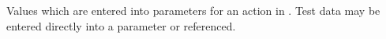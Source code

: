 \item[Test Data]{
Values which are entered into parameters for an action in \gdsteps{}. 
Test data may be entered directly into a parameter or 
referenced.  
}
